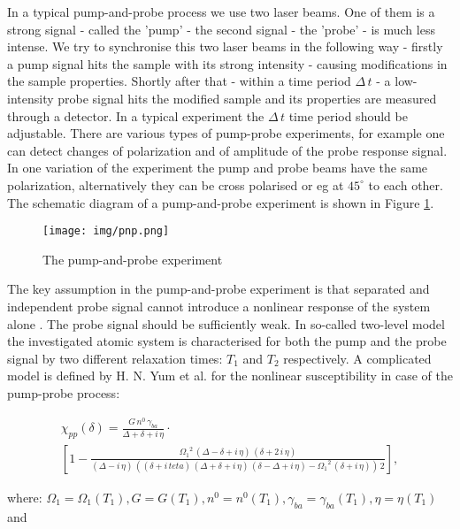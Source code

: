 \documentclass[12pt,twoside,a4paper]{article}
\numberwithin{equation}{subsection}
\numberwithin{figure}{subsection}
\begin{document}
In a typical pump-and-probe process we use two laser beams. One of them is a strong signal - called the 'pump' - the second signal
- the 'probe' - is much less intense. We try to synchronise this two laser beams in the following way - firstly a pump signal hits
the sample with its strong intensity - causing modifications in the sample properties. Shortly after that - within a time period
$\Delta \, t$ - a low-intensity probe signal hits the modified sample and its properties are measured through a detector. In a typical experiment the
$\Delta \, t$ time period should be adjustable. There are various types of pump-probe experiments, for example one can detect
changes of polarization and of amplitude of the probe response signal. In one variation of the experiment the pump and probe beams
have the same polarization, alternatively they can be cross polarised or eg at $45^{\circ}$ to each other. The schematic diagram of a
pump-and-probe experiment is shown in Figure \ref{fig:pump_and_probe}.

\begin{figure} 
  \texttt{[image: img/pnp.png]}
  \caption{The pump-and-probe experiment\label{fig:pump_and_probe}}
\end{figure}


The key assumption in the pump-and-probe experiment is that separated and independent probe signal cannot introduce a nonlinear
response of the system alone \cite{boyd_nlo}. The probe signal should be sufficiently weak. In so-called two-level model the
investigated atomic system is characterised for both the pump and the probe signal by two different relaxation times: ${T_{1}}$ 
and ${T_{2}}$ respectively. A complicated model is defined by H. N. Yum et al. \cite{yum_pump} for the nonlinear susceptibility in
case of the pump-probe process:

\begin{multline}   \label{eq:pump_equation}
     {\chi_{pp}}(\delta ) = \frac {G\,n^{0}\,{\gamma_{ba}}}{\Delta  + \delta  + i\,\eta } \cdot \\
     [1 - \frac {{\Omega_{1}}^{2}\,(\Delta  - \delta  + i\,\eta )\,(\delta  + 2\,i\,\eta )}{(\Delta  - i\,\eta )\,((\delta  + i\,
     teta)\,(\Delta  + \delta  + i\,\eta )\,(\delta  - \Delta  + i\,\eta ) - {\Omega_{1}}^{2}\,(\delta  + i\,\eta ))\,2}],
\end{multline}

where: ${\Omega_{1}} = \Omega_{1} ({T_{1}}), G = G({T_{1}}), n^{0} = n^{0}({T_{1}}), \gamma_{ba} = \gamma_{{ba}}({T_{1}}), \eta =
\eta ({T_{1}})$ and 
\end{document}
